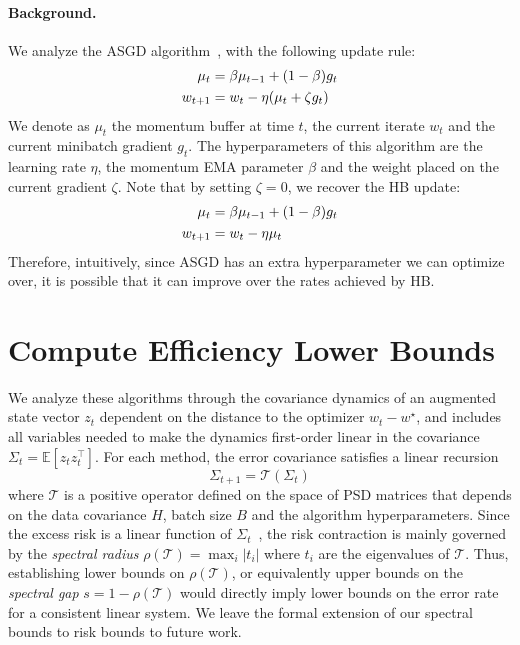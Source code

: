 \documentclass{article}
\newcommand{\E}{\mathbb{E}}
\newcommand{\T}{\mathcal{T}}
\begin{document}
\paragraph{Background.} We analyze the ASGD algorithm~\citep{jain2018accelerating,kidambi2018insufficiency,morwani2025connections}, with the following update rule:
\begin{align}
\label{eqn:asgd_update}
    \mu_t &= \beta \mu_{t-1} + (1-\beta)g_t \notag \\
    w_{t+1}&=w_t-\eta (\mu_t + \zeta g_t)
\end{align}
We denote as $\mu_t$ the momentum buffer at time $t$, the current iterate $w_t$ and the current minibatch gradient $g_t$. The hyperparameters of this algorithm are the learning rate $\eta$, the momentum EMA parameter $\beta$ and the weight placed on the current gradient $\zeta$. Note that by setting $\zeta = 0$, we recover the HB update:
\begin{align}
\label{eqn:hb_update}
    \mu_t &= \beta \mu_{t-1} + (1-\beta)g_t \notag \\
    w_{t+1}&=w_t - \eta \mu_t
\end{align}
Therefore, intuitively, since ASGD has an extra hyperparameter we can optimize over, it is possible that it can improve over the rates achieved by HB. 
\section{Compute Efficiency Lower Bounds}

We analyze these algorithms through the covariance dynamics of an augmented state vector $z_t$ dependent on the distance to the optimizer $w_t - w^\star$, and includes all variables needed to make the dynamics first-order linear in the covariance $\Sigma_t = \E [z_t z_t^\top]$. For each method, the error covariance satisfies a linear recursion
\[
\Sigma_{t+1} = \T(\Sigma_t)
\]
where $\T$ is a positive operator defined on the space of PSD matrices that depends on the data covariance $H$, batch size $B$ and the algorithm hyperparameters. Since the excess risk is a linear function of $\Sigma_t$~\citep{wu2022last,zou2021benign,wu2022power,meterez2025simplified}, the risk contraction is mainly governed by the \textit{spectral radius} $\rho(\T) = \max_i |t_i|$ where $t_i$ are the eigenvalues of $\T$. Thus, establishing lower bounds on $\rho(\T)$, or equivalently upper bounds on the \textit{spectral gap} $s = 1-\rho(\T)$ would directly imply lower bounds on the error rate for a consistent linear system. We leave the formal extension of our spectral bounds to risk bounds to future work.
\end{document}
